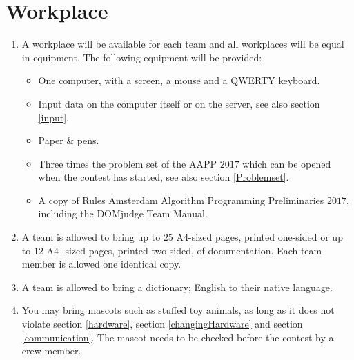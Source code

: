 \documentclass[11pt]{report}
\begin{document}
\section{Workplace}
\begin{enumerate}[label=\bfseries 4.3.\arabic*]
\item A workplace will be available for each team and all workplaces will be equal in equipment. The following equipment will be provided:
\begin{itemize}
	\item One computer, with a screen, a mouse and a QWERTY keyboard. %
	\item Input data on the computer itself or on the server, see also section \ref{input}.
	\item Paper \& pens.
	\item Three times the problem set of the AAPP $2017$ which can be opened when the contest has started, see also section \ref{Problemset}.
	\item A copy of Rules Amsterdam Algorithm Programming Preliminaries $2017$, including the DOMjudge Team Manual.
\end{itemize}
\item A team is allowed to bring up to $25$ A4-sized pages, printed one-sided or up to $12$ A4- sized pages, printed two-sided, of documentation. Each team member is allowed one identical copy.
\item A team is allowed to bring a dictionary; English to their native language.
\item You may bring mascots such as stuffed toy animals, as long as it does not violate section \ref{hardware}, section \ref{changingHardware} and section \ref{communication}. The mascot needs to be checked before the contest by a crew member.
\end{enumerate}
\end{document}
